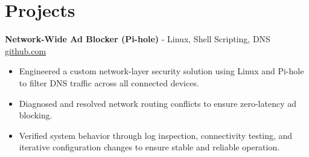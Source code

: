 \documentclass[11pt]{article}       %
\begin{document}

\vspace{-18.5pt}

\section*{Projects}

\textbf{Network-Wide Ad Blocker (Pi-hole)}{ - Linux, Shell Scripting, DNS} \hfill \href{https://github.com/Monica20030707}{github.com} \\
\vspace{-9pt}
\begin{itemize}
  \item Engineered a custom network-layer security solution using Linux and Pi-hole to filter DNS traffic across all connected devices.
  \item Diagnosed and resolved network routing conflicts to ensure zero-latency ad blocking.
  \item Verified system behavior through log inspection, connectivity testing, and iterative configuration changes to ensure stable and reliable operation.
\end{itemize}

\end{document}
